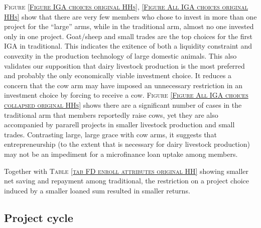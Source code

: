 \begin{palepinkleftbar}
\begin{finding}
\textsc{\small Figure \ref{Figure IGA choices original HHs}, \ref{Figure All IGA choices original HHs}} show that there are very few members who chose to invest in more than one project for the ``large'' arms, while in the \textsf{traditional} arm, almost no one invested only in one project. Goat/sheep and small trades are the top choices for the first IGA in \textsf{traditional}. This indicates the exitence of both a liquidity constraint and convexity in the production technology of large domestic animals. This also validates our supposition that dairy livestock production is the most preferred and probably the only economically viable investment choice. It reduces a concern that the \textsf{cow} arm may have imposed an unnecessary restriction in an investment choice by forcing to receive a cow. \textsc{\small Figure \ref{Figure All IGA choices collapsed original HHs}} shows there are a significant number of cases in the \textsf{traditional} arm that members reportedly raise cows, yet they are also accompanied by pararell projects in smaller livestock production and small trades. Contrasting \textsf{large}, \textsf{large grace} with \textsf{cow} arms, it suggests that entrepreneurship (to the extent that is necessary for dairy livestock production) may not be an impediment for a microfinance loan uptake among members.
\end{finding}
\end{palepinkleftbar}

Together with \textsc{\small Table \ref{tab FD enroll attributes original HH}} showing smaller net saving and repayment among \textsf{traditional}, the restriction on a project choice induced by a smaller loaned sum resulted in smaller returns. 


\subsection{Project cycle}








